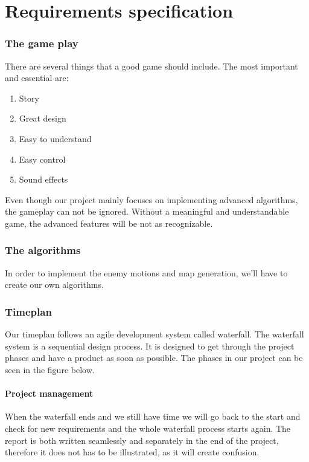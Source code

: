 \chapter{Requirements specification}

\subsection{The game play}%
There are several things that a good game should include. The most important
and essential are:

\begin{enumerate}
\item Story
\item Great design
\item Easy to understand
\item Easy control
\item Sound effects
\end{enumerate}

Even though our project mainly focuses on implementing advanced algorithms, the gameplay
can not be ignored. Without a meaningful and understandable game, the advanced features will
be not as recognizable.

\subsection{The algorithms}
In order to implement the enemy motions and map generation, we'll have to create our
own algorithms.



\subsection{Timeplan} %
Our timeplan follows an agile development system called waterfall.
The waterfall system is a sequential design process.
It is designed to get through the project phases and have a product as soon as
possible. The phases in our project can be seen in the figure below.

\subsubsection{Project management}
When the waterfall ends and we still have time
we will go back to the start and check for new requirements
and the whole waterfall process starts again.
The report is both written seamlessly and separately in the end of the project,
therefore it does not has to be illustrated, as it will create confusion.

